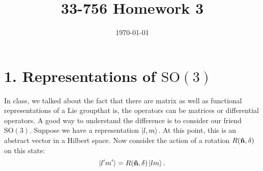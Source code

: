 \documentclass[a4paper,twoside]{article}
\title{33-756 Homework 3}
\date{\today}
\begin{document}
\maketitle
\section*{1. Representations of $\text{SO}(3)$}
In class, we talked about the fact that there are matrix as well as functional representations of a Lie group\textemdash that is, the operators can be matrices or differential operators. A good way to understand the difference is to consider our friend $\text{SO}(3)$. Suppose we have a representation $\ket{l,m} $. At this point, this is an abstract vector in a Hilbert space. Now consider the action of a rotation $ R(\vu{n}, \delta) $ on this state:
\begin{equation}
    \ket{l'm'} = R(\vu{n}, \delta)\ket{lm}.
\end{equation}
\end{document}
